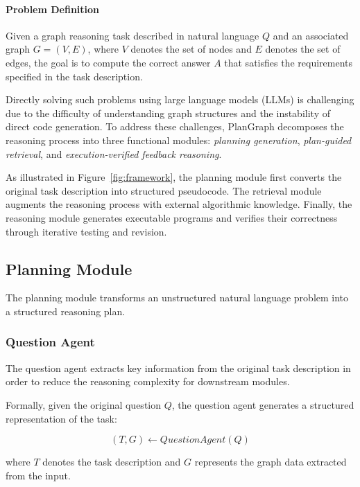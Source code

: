 \documentclass[sigconf,review,anonymous]{acmart}
\begin{document}
\paragraph{Problem Definition}

Given a graph reasoning task described in natural language
$Q$ and an associated graph $G=(V,E)$, where $V$ denotes the
set of nodes and $E$ denotes the set of edges, the goal is to
compute the correct answer $A$ that satisfies the requirements
specified in the task description.

Directly solving such problems using large language models
(LLMs) is challenging due to the difficulty of understanding
graph structures and the instability of direct code generation.
To address these challenges, PlanGraph decomposes the reasoning
process into three functional modules: \textit{planning generation},
\textit{plan-guided retrieval}, and \textit{execution-verified feedback reasoning}.

As illustrated in Figure~\ref{fig:framework}, the planning
module first converts the original task description into
structured pseudocode. The retrieval module augments the
reasoning process with external algorithmic knowledge.
Finally, the reasoning module generates executable programs
and verifies their correctness through iterative testing
and revision.

\subsection{Planning Module}

The planning module transforms an unstructured natural language
problem into a structured reasoning plan.

\subsubsection{Question Agent}

The question agent extracts key information from the original
task description in order to reduce the reasoning complexity
for downstream modules.

Formally, given the original question $Q$, the question agent
generates a structured representation of the task:

\begin{equation}
(T, G) \leftarrow QuestionAgent(Q)
\end{equation}

where $T$ denotes the task description and $G$ represents the
graph data extracted from the input.
\end{document}
